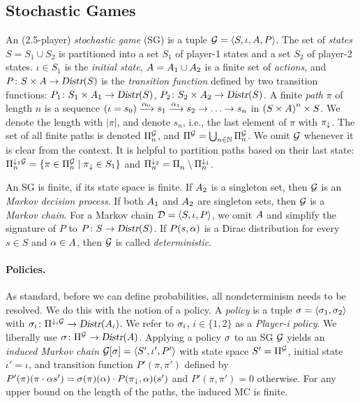 \subsection{Stochastic Games}
An (2.5-player) \emph{stochastic game} (SG) is a tuple $\sg = \langle S, \iota, \Act, P \rangle$. The set of \emph{states} $S = S_1 \cup S_2$ is partitioned into a set $S_1$ of player-1 states and a set $S_2$ of player-2 states. $\iota \in S_1$ is the \emph{initial state}, $\Act = \Act_1 \cup \Act_2$ is a finite set of \emph{actions}, and $P\colon S \times \Act \rightarrow \Distr(S)$ is the \emph{transition function} defined by two transition functions: $P_1\colon S_1 \times \Act_1 \rightarrow \Distr(S)$, $P_2\colon S_2 \times \Act_2 \rightarrow \Distr(S)$. 
A finite \emph{path} $\pi$ of length $n$ is a sequence $(\iota = s_0 ) \xrightarrow{\act_0} s_1 \xrightarrow{\act_1} s_2 \rightarrow \hdots \rightarrow s_n$ in $\left( S \times \Act \right)^{n} \times S$. We denote the length with $|\pi|$, and denote $s_n$, i.e., the last element of $\pi$ with $\last{\pi}$. The set of all finite paths is denoted $\Paths[n]{\sg}$, and $\Paths{\sg} = \bigcup_{n \in \NN} \Paths[n]{\sg}$. We omit $\sg$ whenever it is clear from the context. It is helpful to partition paths based on their last state: $\POnePaths[n]{\sg} = \{ \pi \in \Paths[n]{\sg} \mid \last{\pi} \in S_1 \}$ and $\PTwoPaths[n]{} = \Paths[n]{} \setminus \POnePaths[n]{}$.

An SG is finite, if its state space is finite.
If $\Act_2$ is a singleton set, then $\sg$ is an \emph{Markov decision process}.
If both $\Act_1$ and $\Act_2$ are singleton sets, then $\sg$ is a \emph{Markov chain}. For a Markov chain $\mc = \langle S, \iota, P \rangle$, we omit $\Act$ and simplify the signature of $P$ to $P\colon S\rightarrow \Distr(S)$.
If $P(s,\act)$ is a Dirac distribution for every $s \in S$ and $\act \in \Act$, then $\sg$ is called \emph{deterministic}.


\paragraph{Policies.} 
As standard, before we can define probabilities, all nondeterminism needs to be resolved. We do this with the notion of a policy. A \emph{policy} is a tuple $\sched = \langle \sched_1, \sched_2 \rangle$ with $\sched_i \colon \PiPaths[]{\sg} \rightarrow \Distr(\Act_i)$. We refer to $\sched_i$, $i \in \{ 1, 2 \}$ as a \emph{Player-i policy}. We liberally use $\sched \colon \Paths{\sg} \rightarrow \Distr(\Act)$.
Applying a policy $\sched$ to an SG $\sg$ yields an \emph{induced Markov chain} $\induced{\sg}{\sched} = \langle S', \iota', P' \rangle$ with state space $S' = \Paths{\sg}$, initial state $\iota' = \iota$, and transition function $P'(\pi,\pi')$ defined by $P'(\pi)(\pi \cdot \act s') = \sched(\pi)(\act) \cdot P(\last{\pi},\act)(s')$ and $P'(\pi,\pi') = 0$ otherwise. For any upper bound on the length of the paths, the induced MC is finite. 


